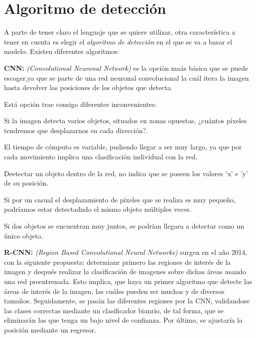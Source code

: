 \section{Algoritmo de detección}
A parte de tener claro el lenguaje que se quiere utilizar, otra característica a tener en cuenta es elegir el \textit{algoritmo de detección} en el que se va a basar el modelo.
Existen diferentes algoritmos:
\begin{list}{\textbullet}{ %
    \addtolength{\itemsep}{-2mm} %
    \setlength{\itemindent}{2mm}}

    \item \textbf{CNN:} \textit{(Convolutional Neuronal Network)} es la opción maás básica que se puede escoger,ya que se parte de una red neuronal convolucional \cite{cnn} la cuál itera la imagen hasta devolver las posiciones de los objetos que detecta.
    
    Está opción trae consigo diferentes inconvenientes:
    \begin{list}{\textbullet}{ %
        \addtolength{\itemsep}{-2mm} %
        \setlength{\itemindent}{2mm}}
        \item Si la imagen detecta varios objetos, situados en zonas opuestas, ¿cuántos píxeles tendremos que desplazarnos en cada dirección?.
        \item El tiempo de cómputo es variable, pudiendo llegar a ser muy largo, ya que por cada movimiento implica una clasificación individual con la red.
        \item Deetectar un objeto dentro de la red, no indica que se poseen los valores 'x' e 'y' de su posición.
        \item Si por un casual el desplazamiento de píxeles que se realiza es muy pequeño, podríamos estar detectadndo el mismo objeto múltiples veces.
        \item Si dos objetos se encuentran muy juntos, se podrían llegara a detectar como un único objeto.    
    \end{list}
    
    \item \textbf{R-CNN:} \textit{(Region Based Convolutional Neural Networks)} surgen en el año 2014, con la siguiente propuesta: determianr primero las regiones de interés de la imagen y después realizar la clasificación de imagenes sobre dichas áreas usando una red preentrenada.\cite{r-cnn}
    Esto implica, que haya un primer algoritmo que detecte las áreas de interés de la imagen, las cuáles pueden ser muchas y de diversos tamaños. Seguidamente, se pasán las diferentes regiones por la CNN, validandose las clases correctas mediante un clasificador bianrio, de tal forma, que se eliminarán
    las que tenga un bajo nivel de confianza. Por último, se ajustaría la posición mediante un regresor.
    

\end{list}
